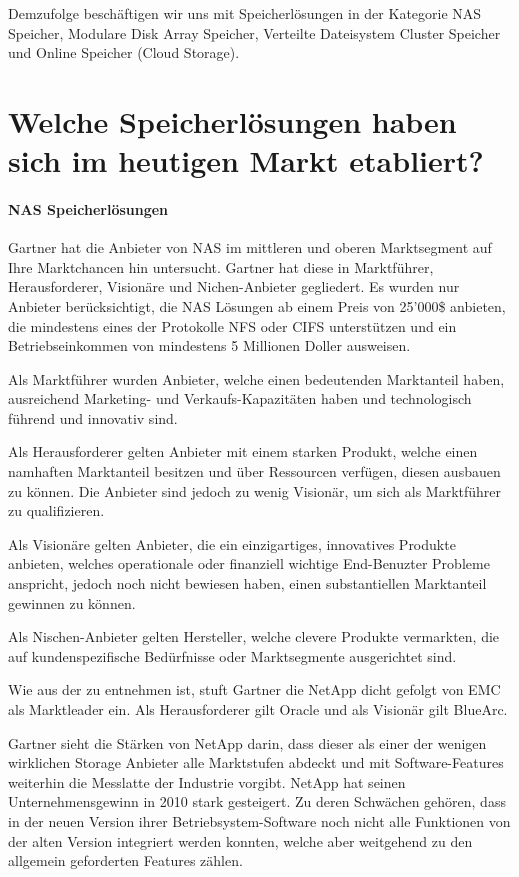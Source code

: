 Demzufolge beschäftigen wir uns mit Speicherlösungen in der Kategorie NAS Speicher, Modulare Disk Array Speicher, Verteilte Dateisystem Cluster Speicher und Online Speicher (Cloud Storage).

\section{Welche Speicherlösungen haben sich im heutigen Markt etabliert?}\label{sec:MarktEtabliert}

\paragraph*{NAS Speicherlösungen}
Gartner hat die Anbieter von NAS im mittleren und oberen Marktsegment auf Ihre Marktchancen hin untersucht. Gartner hat diese in Marktführer, Herausforderer, Visionäre und Nichen-Anbieter gegliedert. Es wurden nur Anbieter berücksichtigt, die NAS Lösungen ab einem Preis von 25'000\$ anbieten, die mindestens eines der Protokolle NFS oder CIFS unterstützen und ein Betriebseinkommen von mindestens 5 Millionen Doller ausweisen. 

Als Marktführer wurden Anbieter, welche einen bedeutenden Marktanteil haben, ausreichend Marketing- und Verkaufs-Kapazitäten haben und technologisch führend und innovativ sind.

Als Herausforderer gelten Anbieter mit einem starken Produkt, welche einen namhaften Marktanteil besitzen und über Ressourcen verfügen, diesen ausbauen zu können. Die Anbieter sind jedoch zu wenig Visionär, um sich als Marktführer zu qualifizieren.

Als Visionäre gelten Anbieter, die ein einzigartiges, innovatives Produkte anbieten, welches operationale oder finanziell wichtige End-Benuzter Probleme anspricht, jedoch noch nicht bewiesen haben, einen substantiellen Marktanteil gewinnen zu können.

Als Nischen-Anbieter gelten Hersteller, welche clevere Produkte vermarkten, die auf kundenspezifische Bedürfnisse oder Marktsegmente ausgerichtet sind.

Wie aus der  zu entnehmen ist, stuft Gartner die NetApp dicht gefolgt von EMC als Marktleader ein. Als Herausforderer gilt Oracle und als Visionär gilt BlueArc.

Gartner sieht die Stärken von NetApp darin, dass dieser als einer der wenigen wirklichen Storage Anbieter alle Marktstufen abdeckt und mit Software-Features weiterhin die Messlatte der Industrie vorgibt. NetApp hat seinen Unternehmensgewinn in 2010 stark gesteigert. Zu deren Schwächen gehören, dass in der neuen Version ihrer Betriebsystem-Software noch nicht alle Funktionen von der alten Version integriert werden konnten, welche aber weitgehend zu den allgemein geforderten Features zählen.

